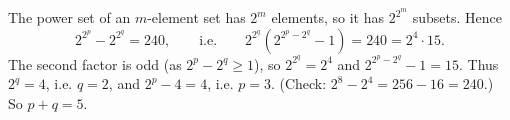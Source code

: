 The power set of an $m$-element set has $2^m$ elements, so it has $2^{2^m}$ subsets. Hence
\[2^{2^p}-2^{2^q}=240,\qquad\text{i.e.}\qquad 2^{2^q}\left(2^{2^p-2^q}-1\right)=240=2^4\cdot15.\]
The second factor is odd (as $2^p-2^q\ge1$), so $2^{2^q}=2^4$ and $2^{2^p-2^q}-1=15$. Thus $2^q=4$, i.e. $q=2$, and $2^p-4=4$, i.e. $p=3$. (Check: $2^8-2^4=256-16=240$.) So $p+q=\boxed{5}$.

